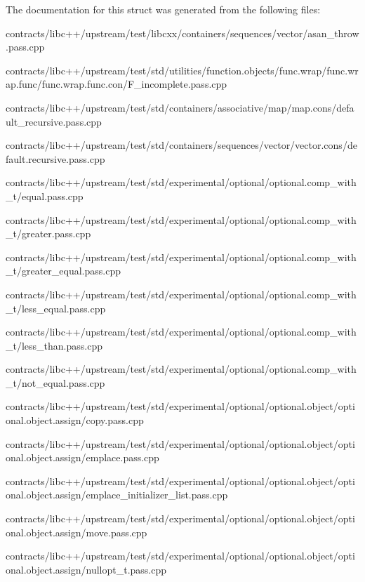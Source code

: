 The documentation for this struct was generated from the following files\+:\begin{DoxyCompactItemize}
\item 
contracts/libc++/upstream/test/libcxx/containers/sequences/vector/asan\+\_\+throw.\+pass.\+cpp\item 
contracts/libc++/upstream/test/std/utilities/function.\+objects/func.\+wrap/func.\+wrap.\+func/func.\+wrap.\+func.\+con/F\+\_\+incomplete.\+pass.\+cpp\item 
contracts/libc++/upstream/test/std/containers/associative/map/map.\+cons/default\+\_\+recursive.\+pass.\+cpp\item 
contracts/libc++/upstream/test/std/containers/sequences/vector/vector.\+cons/default.\+recursive.\+pass.\+cpp\item 
contracts/libc++/upstream/test/std/experimental/optional/optional.\+comp\+\_\+with\+\_\+t/equal.\+pass.\+cpp\item 
contracts/libc++/upstream/test/std/experimental/optional/optional.\+comp\+\_\+with\+\_\+t/greater.\+pass.\+cpp\item 
contracts/libc++/upstream/test/std/experimental/optional/optional.\+comp\+\_\+with\+\_\+t/greater\+\_\+equal.\+pass.\+cpp\item 
contracts/libc++/upstream/test/std/experimental/optional/optional.\+comp\+\_\+with\+\_\+t/less\+\_\+equal.\+pass.\+cpp\item 
contracts/libc++/upstream/test/std/experimental/optional/optional.\+comp\+\_\+with\+\_\+t/less\+\_\+than.\+pass.\+cpp\item 
contracts/libc++/upstream/test/std/experimental/optional/optional.\+comp\+\_\+with\+\_\+t/not\+\_\+equal.\+pass.\+cpp\item 
contracts/libc++/upstream/test/std/experimental/optional/optional.\+object/optional.\+object.\+assign/copy.\+pass.\+cpp\item 
contracts/libc++/upstream/test/std/experimental/optional/optional.\+object/optional.\+object.\+assign/emplace.\+pass.\+cpp\item 
contracts/libc++/upstream/test/std/experimental/optional/optional.\+object/optional.\+object.\+assign/emplace\+\_\+initializer\+\_\+list.\+pass.\+cpp\item 
contracts/libc++/upstream/test/std/experimental/optional/optional.\+object/optional.\+object.\+assign/move.\+pass.\+cpp\item 
contracts/libc++/upstream/test/std/experimental/optional/optional.\+object/optional.\+object.\+assign/nullopt\+\_\+t.\+pass.\+cpp\item 

\end{DoxyCompactItemize}
